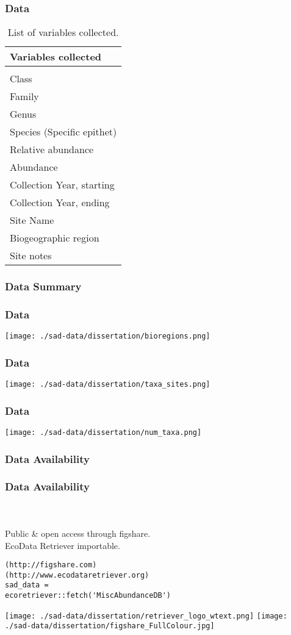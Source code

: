 \documentclass[14pt]{beamer}
\begin{document}
\begin{frame}[shrink=30]
\frametitle{Data}
\begin{table}
\begin{tabular}{l} 
 Variables collected\\ 
\hline
\\
 Class \\
 Family\\
 Genus \\
 Species (Specific epithet)\\
 Relative abundance \\
 Abundance \\
 Collection Year, starting\\
 Collection Year, ending \\
 Site Name \\
 Biogeographic region \\
 Site notes\\ 
\end{tabular}
\caption{List of variables collected.}
\end{table}
\end{frame}

\subsubsection{Data Summary}
\begin{frame}{}
\frametitle{Data}
\texttt{[image: ./sad-data/dissertation/bioregions.png]}
\end{frame}

\begin{frame}{}
\frametitle{Data}
\texttt{[image: ./sad-data/dissertation/taxa\_sites.png]}
\end{frame}

\begin{frame}{}
\frametitle{Data}
\texttt{[image: ./sad-data/dissertation/num\_taxa.png]}
\end{frame}

\subsubsection{Data Availability}
\begin{frame}[fragile]
\frametitle{Data Availability}
~\\
~\\
Public \& open access through figshare.\\
EcoData Retriever importable.\\
\begin{verbatim}
(http://figshare.com)
(http://www.ecodataretriever.org)
sad_data = 
ecoretriever::fetch('MiscAbundanceDB')
\end{verbatim}
\texttt{[image: ./sad-data/dissertation/retriever\_logo\_wtext.png]}
\texttt{[image: ./sad-data/dissertation/figshare\_FullColour.jpg]}
\end{frame}
\end{document}
